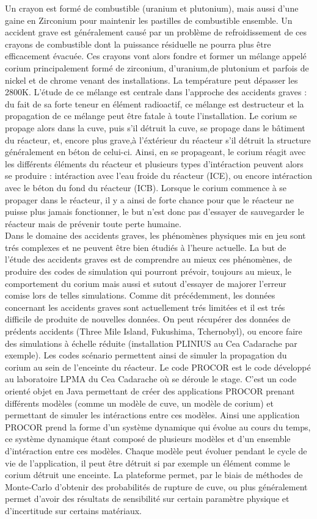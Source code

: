 Un crayon est formé de combustible (uranium et plutonium), mais aussi d'une gaine en Zirconium pour maintenir les pastilles de combustible ensemble. Un accident grave est généralement causé par un problème de refroidissement de ces crayons de combustible dont la puissance résiduelle ne pourra plus être efficacement évacuée. Ces crayons vont alors fondre et former un mélange appelé corium principalement formé de zirconium, d'uranium,de plutonium et parfois de nickel et de chrome venant des installations. La température peut dépasser les 2800K. L'étude de ce mélange est centrale dans l'approche des accidents graves : du fait de sa forte teneur en élément radioactif, ce mélange est destructeur et la propagation de ce mélange peut être fatale à toute l'installation. Le corium se propage alors dans la cuve, puis s'il détruit la cuve, se propage dans le bâtiment du réacteur, et, encore plus grave,à l'éxtérieur du réacteur s'il détruit la structure généralement en béton de celui-ci. Ainsi, en se propageant, le corium réagit avec les différents éléments du réacteur et plusieurs types d'intéraction peuvent alors se produire : intéraction avec l'eau froide du réacteur (ICE), ou encore intéraction avec le béton du fond du réacteur (ICB).  Lorsque le corium commence à se propager dans le réacteur, il y a ainsi de forte chance pour que le réacteur ne puisse plus jamais fonctionner, le but n'est donc pas d'essayer de sauvegarder le réacteur mais de prévenir toute perte humaine. \\

Dans le domaine des accidents graves, les phénomènes physiques mis en jeu sont trés complexes et ne peuvent être bien étudiés à l'heure actuelle. La but de l'étude des accidents graves est de comprendre au mieux ces 
phénomènes, de produire des codes de simulation qui pourront prévoir, toujours au mieux, le comportement du corium mais aussi et sutout d'essayer de majorer l'erreur comise lors de telles simulations. Comme dit précédemment,
les données concernant les accidents graves sont actuellement trés limitées et il est trés difficile de produite de nouvelles données. On peut récupérer des données de prédents accidents (Three Mile Island, Fukushima, Tchernobyl),
ou encore faire des simulations à échelle réduite (installation PLINIUS au Cea Cadarache par exemple). Les codes scénario permettent ainsi de simuler la propagation du corium au sein de l'enceinte du réacteur. Le code PROCOR 
est le code développé au laboratoire LPMA du Cea Cadarache où se déroule le stage. C'est un code orienté objet en Java permettant de créer des applications PROCOR prenant différents modèles (comme un modèle de cuve, un modèle 
de corium) et permettant de simuler les intéractions entre ces modèles. Ainsi une application PROCOR prend la forme d'un système dynamique qui évolue au cours du temps, ce système dynamique étant composé de plusieurs modèles
et d'un ensemble d'intéraction entre ces modèles. Chaque modèle peut évoluer pendant le cycle de vie de l'application, il peut être détruit si par exemple un élément comme le corium détruit une enceinte. La plateforme permet,
 par le biais de méthodes de Monte-Carlo d'obtenir des probabilités de rupture de cuve, ou plus généralement permet d'avoir des résultats de sensibilité sur certain paramètre physique et d'incertitude sur certains matériaux. 